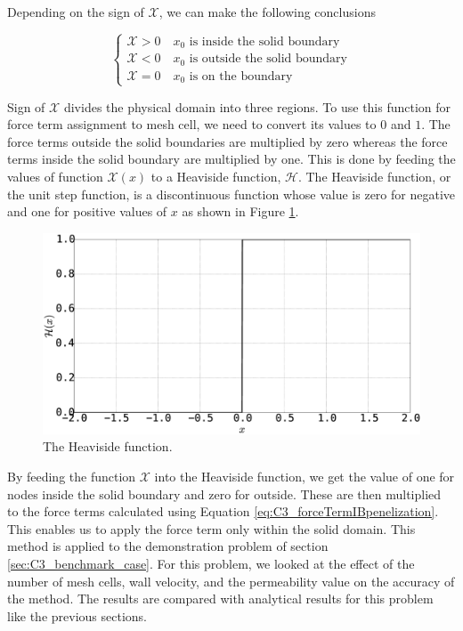 Depending on the sign of $\mathcal{X}$, we can make the following conclusions

\begin{equation}
\begin{cases}
    \mathcal{X} > 0 \quad \text{$x_0$ is inside the solid boundary} \\
    \mathcal{X} < 0 \quad \text{$x_0$ is outside the solid boundary} \\
    \mathcal{X} = 0 \quad \text{$x_0$ is on the boundary}
\end{cases}
\end{equation}

Sign of $\mathcal{X}$ divides the physical domain into three regions. To use this function for force term assignment to mesh cell, we need to convert its values to $0$ and $1$. The force terms outside the solid boundaries are multiplied by zero whereas the force terms inside the solid boundary are multiplied by one. This is done by feeding the values of function $\mathcal{X}(x)$ to a Heaviside function, $\mathcal{H}$. The Heaviside function, or the unit step function, is a discontinuous function whose value is zero for negative and one for positive values of $x$ as shown in Figure \ref{fig:C3_heavisideFunction}.

\begin{figure}[H]
    \centering
    \includegraphics[width=14.cm]{Chapter_3/figure/Heaviside_Function.eps}
    \caption{The Heaviside function.}
    \label{fig:C3_heavisideFunction}
\end{figure}

By feeding the function $\mathcal{X}$ into the Heaviside function, we get the value of one for nodes inside the solid boundary and zero for outside. These are then multiplied to the force terms calculated using Equation \eqref{eq:C3_forceTermIBpenelization}. This enables us to apply the force term only within the solid domain. This method is applied to the demonstration problem of section \ref{sec:C3_benchmark_case}. For this problem, we looked at the effect of the number of mesh cells, wall velocity, and the permeability value on the accuracy of the method. The results are compared with analytical results for this problem like the previous sections.

